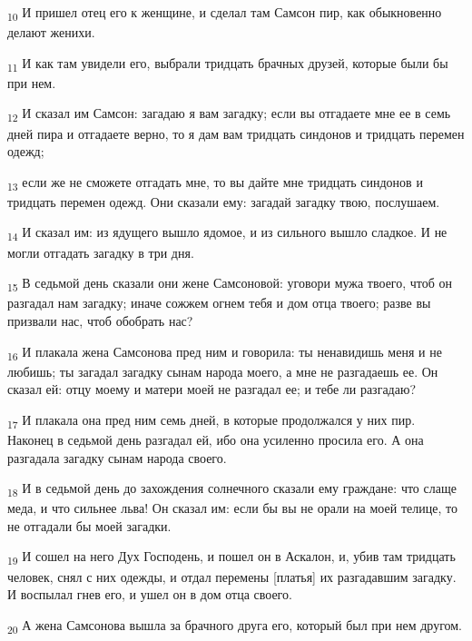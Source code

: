 \begin{tcolorbox}
\textsubscript{10} И пришел отец его к женщине, и сделал там Самсон пир, как обыкновенно делают женихи.
\end{tcolorbox}
\begin{tcolorbox}
\textsubscript{11} И как там увидели его, выбрали тридцать брачных друзей, которые были бы при нем.
\end{tcolorbox}
\begin{tcolorbox}
\textsubscript{12} И сказал им Самсон: загадаю я вам загадку; если вы отгадаете мне ее в семь дней пира и отгадаете верно, то я дам вам тридцать синдонов и тридцать перемен одежд;
\end{tcolorbox}
\begin{tcolorbox}
\textsubscript{13} если же не сможете отгадать мне, то вы дайте мне тридцать синдонов и тридцать перемен одежд. Они сказали ему: загадай загадку твою, послушаем.
\end{tcolorbox}
\begin{tcolorbox}
\textsubscript{14} И сказал им: из ядущего вышло ядомое, и из сильного вышло сладкое. И не могли отгадать загадку в три дня.
\end{tcolorbox}
\begin{tcolorbox}
\textsubscript{15} В седьмой день сказали они жене Самсоновой: уговори мужа твоего, чтоб он разгадал нам загадку; иначе сожжем огнем тебя и дом отца твоего; разве вы призвали нас, чтоб обобрать нас?
\end{tcolorbox}
\begin{tcolorbox}
\textsubscript{16} И плакала жена Самсонова пред ним и говорила: ты ненавидишь меня и не любишь; ты загадал загадку сынам народа моего, а мне не разгадаешь ее. Он сказал ей: отцу моему и матери моей не разгадал ее; и тебе ли разгадаю?
\end{tcolorbox}
\begin{tcolorbox}
\textsubscript{17} И плакала она пред ним семь дней, в которые продолжался у них пир. Наконец в седьмой день разгадал ей, ибо она усиленно просила его. А она разгадала загадку сынам народа своего.
\end{tcolorbox}
\begin{tcolorbox}
\textsubscript{18} И в седьмой день до захождения солнечного сказали ему граждане: что слаще меда, и что сильнее льва! Он сказал им: если бы вы не орали на моей телице, то не отгадали бы моей загадки.
\end{tcolorbox}
\begin{tcolorbox}
\textsubscript{19} И сошел на него Дух Господень, и пошел он в Аскалон, и, убив там тридцать человек, снял с них одежды, и отдал перемены [платья] их разгадавшим загадку. И воспылал гнев его, и ушел он в дом отца своего.
\end{tcolorbox}
\begin{tcolorbox}
\textsubscript{20} А жена Самсонова вышла за брачного друга его, который был при нем другом.
\end{tcolorbox}
